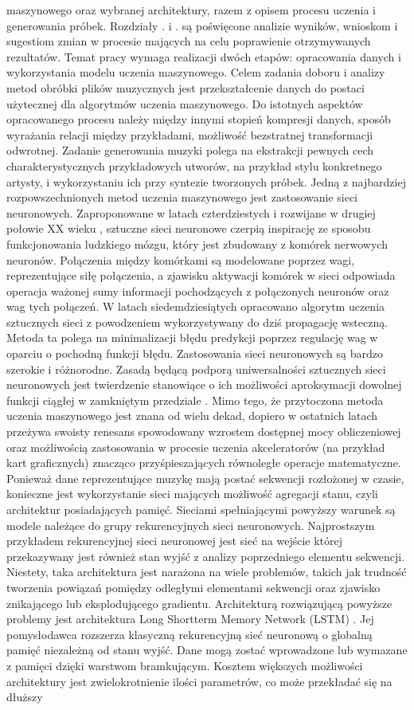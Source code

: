 maszynowego oraz  wybranej architektury, razem z opisem procesu uczenia i generowania próbek. Rozdziały . i . są poświęcone analizie wyników, wnioskom i sugestiom zmian w procesie mających na celu  poprawienie otrzymywanych rezultatów.   Temat pracy wymaga realizacji dwóch etapów: opracowania danych i wykorzystania modelu   uczenia maszynowego.   Celem zadania doboru i analizy metod obróbki plików muzycznych jest    przekształcenie danych do postaci użytecznej dla algorytmów uczenia maszynowego.   Do istotnych aspektów opracowanego procesu należy między innymi stopień kompresji danych,   sposób wyrażania relacji między przykładami, możliwość bezstratnej transformacji odwrotnej.    Zadanie generowania muzyki polega na ekstrakcji pewnych cech charakterystycznych   przykładowych utworów, na przykład stylu konkretnego artysty,    i wykorzystaniu ich przy syntezie tworzonych próbek.        Jedną z najbardziej rozpowszechnionych metod uczenia maszynowego jest zastosowanie sieci neuronowych. Zaproponowane w latach czterdziestych i rozwijane w drugiej połowie XX wieku , sztuczne sieci neuronowe czerpią inspirację ze sposobu funkcjonowania ludzkiego mózgu, który jest zbudowany z komórek nerwowych  neuronów. Połączenia między komórkami są modelowane poprzez wagi, reprezentujące siłę połączenia, a zjawisku aktywacji komórek w sieci odpowiada operacja ważonej sumy informacji pochodzących z połączonych neuronów oraz wag tych połączeń. W latach siedemdziesiątych opracowano algorytm uczenia sztucznych sieci z powodzeniem wykorzystywany do dziś  propagację wsteczną. Metoda ta polega na minimalizacji błędu predykcji poprzez regulację wag w oparciu o pochodną funkcji błędu. Zastosowania sieci neuronowych są bardzo szerokie i różnorodne. Zasadą będącą podporą uniwersalności  sztucznych sieci neuronowych jest twierdzenie stanowiące o ich możliwości aproksymacji dowolnej  funkcji ciągłej w zamkniętym przedziale . Mimo tego, że przytoczona metoda uczenia maszynowego jest znana od wielu dekad, dopiero w ostatnich latach przeżywa swoisty renesans spowodowany wzrostem dostępnej mocy obliczeniowej oraz  możliwością zastosowania w procesie uczenia akceleratorów (na przykład kart graficznych) znacząco  przyśpieszających równoległe operacje matematyczne. Ponieważ dane reprezentujące muzykę mają postać sekwencji rozłożonej w czasie,  konieczne jest wykorzystanie sieci mających możliwość agregacji stanu, czyli architektur posiadających pamięć. Sieciami spełniającymi powyższy warunek są modele należące do grupy rekurencyjnych sieci neuronowych. Najprostszym przykładem rekurencyjnej sieci neuronowej jest sieć na wejście której  przekazywany jest również stan wyjść z analizy poprzedniego elementu sekwencji. Niestety, taka architektura jest narażona na wiele problemów, takich jak trudność tworzenia powiązań pomiędzy odległymi elementami sekwencji oraz zjawisko znikającego lub eksplodującego gradientu. Architekturą rozwiązującą powyższe problemy jest architektura Long Shortterm Memory Network (LSTM) .  Jej pomysłodawca rozszerza klasyczną rekurencyjną sieć neuronową o globalną pamięć niezależną od stanu wyjść. Dane mogą zostać wprowadzone lub wymazane z pamięci dzięki warstwom bramkującym.  Kosztem większych możliwości architektury jest zwielokrotnienie  ilości parametrów, co może przekładać się na dłuższy 